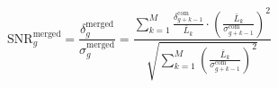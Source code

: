 \begin{equation}
    \label{eq:merged_snr}
    \text{SNR}_{g}^\text{merged} = \frac{\delta^\text{merged}_{g}}{\sigma^\text{merged}_{g}} = \frac{\sum\limits_{k = 1}^{M}\frac{\delta_{g+k-1}^\text{com}}{\bar{L}_{k}} \cdot \left(\frac{\bar{L}_{k}}{\sigma_{g+k-1}^\text{com}}\right)^2}{\sqrt{\sum\limits_{k = 1}^{M} \left(\frac{\bar{L}_{k}}{\sigma_{g+k-1}^\text{com}}\right)^2}}
\end{equation}





